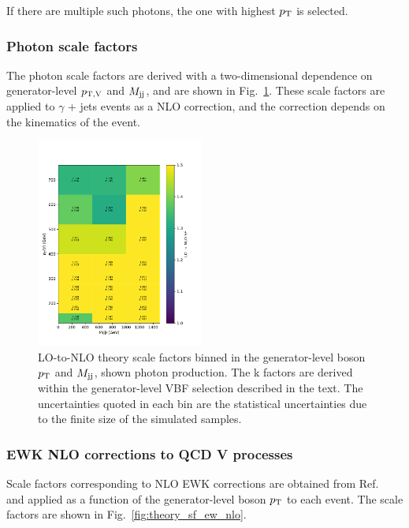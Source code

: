 If there are multiple such photons, the one with highest $p_{\textrm{T}}$ is selected.

\subsubsection{Photon scale factors}

The photon scale factors are derived with a two-dimensional dependence on generator-level $p_{\mathrm{T},\mathrm{V}}$ and $M_{\textrm{jj}}$, and are shown in 
Fig.~\ref{fig:theory_sf_qcd_nlo_2d-photon}. These scale factors are applied to $\gamma$ + jets events as a NLO correction, and the correction depends
on the kinematics of the event.

\begin{figure}[ht!]
    \begin{center}
        \includegraphics[width=0.49\textwidth]{ScaleFactors/NLO/2d_gjets_gen_vpt_vbf_stat1.pdf}
        \caption{
            LO-to-NLO theory scale factors binned in the generator-level boson $p_{\textrm{T}}$ and $M_{\textrm{jj}}$, shown photon production.
            The k factors are derived within the generator-level VBF selection described in the text.
            The uncertainties quoted in each bin are the statistical uncertainties due to the finite size of the simulated samples.
          }
      \label{fig:theory_sf_qcd_nlo_2d-photon}
    \end{center}
\end{figure}

\subsubsection{EWK NLO corrections to QCD V processes}

Scale factors corresponding to NLO EWK corrections are obtained from Ref.~\cite{DMTheory} and applied as a function of the generator-level boson $p_{\textrm{T}}$
to each event. The scale factors are shown in Fig.~\ref{fig:theory_sf_ew_nlo}.

